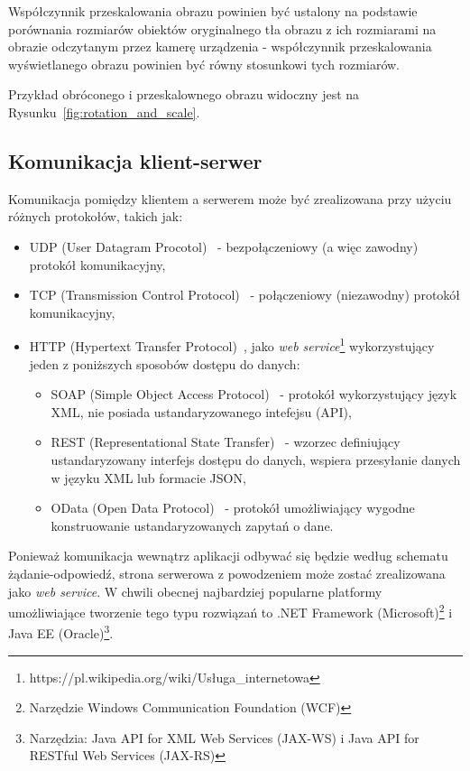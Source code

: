 Współczynnik przeskalowania obrazu powinien być ustalony na podstawie porównania rozmiarów obiektów oryginalnego tła obrazu z ich rozmiarami na obrazie odczytanym przez kamerę urządzenia - współczynnik przeskalowania wyświetlanego obrazu powinien być równy stosunkowi tych rozmiarów.

Przykład obróconego i przeskalownego obrazu widoczny jest na Rysunku~\ref{fig:rotation_and_scale}.



\subsection{Komunikacja klient-serwer}
Komunikacja pomiędzy klientem a serwerem może być zrealizowana przy użyciu różnych protokołów, takich jak:
\begin{itemize}
 \item UDP (User Datagram Procotol)~\cite{udp} - bezpołączeniowy (a więc zawodny) protokół komunikacyjny,
 \item TCP (Transmission Control Protocol)~\cite{tcp} - połączeniowy (niezawodny) protokół komunikacyjny,
 \item HTTP (Hypertext Transfer Protocol)~\cite{http1,http2}, jako \emph{web service}\footnote{https://pl.wikipedia.org/wiki/Usługa\_internetowa} wykorzystujący jeden z poniższych sposobów dostępu do danych:
  \begin{itemize}
   \item SOAP (Simple Object Access Protocol)~\cite{soap} - protokół wykorzystujący język XML, nie posiada ustandaryzowanego intefejsu (API),
   \item REST (Representational State Transfer)~\cite{rest} - wzorzec definiujący ustandaryzowany interfejs dostępu do danych, wspiera przesyłanie danych w języku XML lub formacie JSON,
   \item OData (Open Data Protocol)~\cite{odata} - protokół umożliwiający wygodne konstruowanie ustandaryzowanych zapytań o dane.
  \end{itemize}
\end{itemize}

Ponieważ komunikacja wewnątrz aplikacji odbywać się będzie według schematu żądanie-odpowiedź, strona serwerowa z powodzeniem może zostać zrealizowana jako \emph{web service}.
W chwili obecnej najbardziej popularne platformy umożliwiające tworzenie tego typu rozwiązań to .NET Framework (Microsoft)\footnote{Narzędzie Windows Communication Foundation (WCF)} i Java EE (Oracle)\footnote{Narzędzia: Java API for XML Web Services (JAX-WS) i  Java API for RESTful Web Services (JAX-RS)}.

